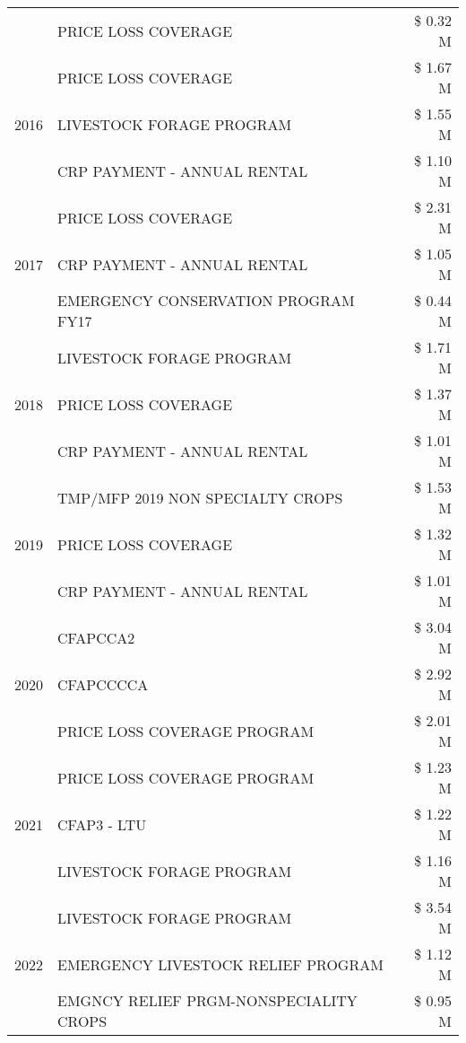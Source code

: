 \begin{tabular}{llr}
 & PRICE LOSS COVERAGE & \$ 0.32 M \\
\cline{1-3}
\multirow[t]{3}{*}{2016} & PRICE LOSS COVERAGE & \$ 1.67 M \\
 & LIVESTOCK FORAGE PROGRAM & \$ 1.55 M \\
 & CRP PAYMENT - ANNUAL RENTAL & \$ 1.10 M \\
\cline{1-3}
\multirow[t]{3}{*}{2017} & PRICE LOSS COVERAGE & \$ 2.31 M \\
 & CRP PAYMENT - ANNUAL RENTAL & \$ 1.05 M \\
 & EMERGENCY CONSERVATION PROGRAM FY17 & \$ 0.44 M \\
\cline{1-3}
\multirow[t]{3}{*}{2018} & LIVESTOCK FORAGE PROGRAM & \$ 1.71 M \\
 & PRICE LOSS COVERAGE & \$ 1.37 M \\
 & CRP PAYMENT - ANNUAL RENTAL & \$ 1.01 M \\
\cline{1-3}
\multirow[t]{3}{*}{2019} & TMP/MFP 2019 NON SPECIALTY CROPS & \$ 1.53 M \\
 & PRICE LOSS COVERAGE & \$ 1.32 M \\
 & CRP PAYMENT - ANNUAL RENTAL & \$ 1.01 M \\
\cline{1-3}
\multirow[t]{3}{*}{2020} & CFAPCCA2 & \$ 3.04 M \\
 & CFAPCCCCA & \$ 2.92 M \\
 & PRICE LOSS COVERAGE PROGRAM & \$ 2.01 M \\
\cline{1-3}
\multirow[t]{3}{*}{2021} & PRICE LOSS COVERAGE PROGRAM & \$ 1.23 M \\
 & CFAP3 - LTU & \$ 1.22 M \\
 & LIVESTOCK FORAGE PROGRAM & \$ 1.16 M \\
\cline{1-3}
\multirow[t]{3}{*}{2022} & LIVESTOCK FORAGE PROGRAM & \$ 3.54 M \\
 & EMERGENCY LIVESTOCK RELIEF PROGRAM & \$ 1.12 M \\
 & EMGNCY RELIEF PRGM-NONSPECIALITY CROPS & \$ 0.95 M \\
\cline{1-3}
\bottomrule
\end{tabular}
